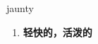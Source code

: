 
\begin{frame}
{\huge jaunty}
\begin{center}
\begin{enumerate}\Large
  \item \textbf{轻快的，活泼的}
\end{enumerate}
\end{center}
\end{frame}
